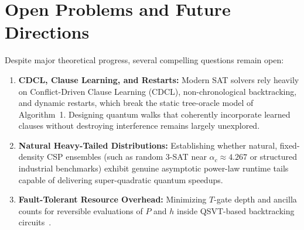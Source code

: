 \documentclass[11pt,a4paper]{article}
\begin{document}
\section{Open Problems and Future Directions}

Despite major theoretical progress, several compelling questions remain open:
\begin{enumerate}
    \item \textbf{CDCL, Clause Learning, and Restarts:} Modern SAT solvers rely heavily on Conflict-Driven Clause Learning (CDCL), non-chronological backtracking, and dynamic restarts, which break the static tree-oracle model of Algorithm~1. Designing quantum walks that coherently incorporate learned clauses without destroying interference remains largely unexplored.
    \item \textbf{Natural Heavy-Tailed Distributions:} Establishing whether natural, fixed-density CSP ensembles (such as random 3-SAT near $\alpha_c \approx 4.267$ or structured industrial benchmarks) exhibit genuine asymptotic power-law runtime tails capable of delivering super-quadratic quantum speedups.
    \item \textbf{Fault-Tolerant Resource Overhead:} Minimizing $T$-gate depth and ancilla counts for reversible evaluations of $P$ and $h$ inside QSVT-based backtracking circuits~\cite{aoki2026}.
\end{enumerate}
\end{document}
